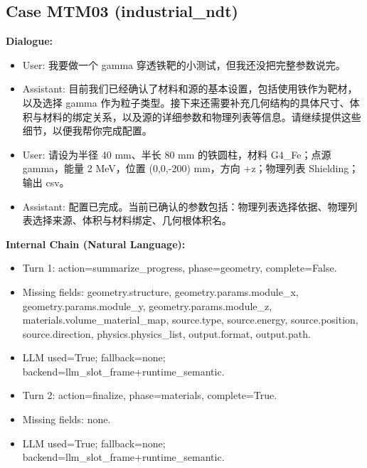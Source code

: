 \documentclass[11pt]{ctexart}
\begin{document}
\subsection{Case MTM03 (industrial\_ndt)}
\textbf{Dialogue:}
\begin{itemize}
\item User: 我要做一个 gamma 穿透铁靶的小测试，但我还没把完整参数说完。
\item Assistant: 目前我们已经确认了材料和源的基本设置，包括使用铁作为靶材，以及选择 gamma 作为粒子类型。接下来还需要补充几何结构的具体尺寸、体积与材料的绑定关系，以及源的详细参数和物理列表等信息。请继续提供这些细节，以便我帮你完成配置。
\item User: 请设为半径 40 mm、半长 80 mm 的铁圆柱，材料 G4\_Fe；点源 gamma，能量 2 MeV，位置 (0,0,-200) mm，方向 +z；物理列表 Shielding；输出 csv。
\item Assistant: 配置已完成。当前已确认的参数包括：物理列表选择依据、物理列表选择来源、体积与材料绑定、几何根体积名。
\end{itemize}
\textbf{Internal Chain (Natural Language):}
\begin{itemize}
\item Turn 1: action=summarize\_progress, phase=geometry, complete=False.
\item Missing fields: geometry.structure, geometry.params.module\_x, geometry.params.module\_y, geometry.params.module\_z, materials.volume\_material\_map, source.type, source.energy, source.position, source.direction, physics.physics\_list, output.format, output.path.
\item LLM used=True; fallback=none; backend=llm\_slot\_frame+runtime\_semantic.
\item Turn 2: action=finalize, phase=materials, complete=True.
\item Missing fields: none.
\item LLM used=True; fallback=none; backend=llm\_slot\_frame+runtime\_semantic.
\end{itemize}
\end{document}
